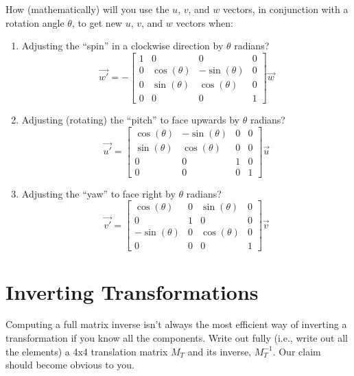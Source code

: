 \documentclass[10pt,twocolumn]{article}
\begin{document}
\begin{framed}
\noindent {\bf [1/2 pt. each]} How (mathematically) will you use the $u$, $v$, and $w$ vectors, in conjunction with a rotation angle $\theta$, to get new $u$, $v$, and $w$ vectors when:
\begin{enumerate}
\item Adjusting the ``spin'' in a clockwise direction by $\theta$ radians?\\
\[ \vec{w'} = -\begin{bmatrix}
    1 &            0 &             0 & 0 \\
    0 & \cos(\theta) & -\sin(\theta) & 0 \\
    0 & \sin(\theta) &  \cos(\theta) & 0 \\
               0 &             0 & 0 & 1
\end{bmatrix}\vec{w}\]


\item Adjusting (rotating) the ``pitch'' to face upwards by $\theta$ radians?\\
\[\vec{u'} = \begin{bmatrix}
    \cos(\theta) & -\sin(\theta) & 0 & 0 \\
    \sin(\theta) &  \cos(\theta) & 0 & 0 \\
               0 &             0 & 1 & 0 \\
               0 &             0 & 0 & 1
\end{bmatrix}\vec{u}
\]
\item Adjusting the ``yaw'' to face right by $\theta$ radians?\\
\[ \vec{v'} = \begin{bmatrix}
    \cos(\theta)  & 0 & \sin(\theta) & 0 \\
               0  & 1 &            0 & 0 \\
    -\sin(\theta) & 0 & \cos(\theta) & 0 \\
               0  & 0 &            0 & 1
\end{bmatrix}\vec{v}\]
\end{enumerate}
\end{framed}

\section{Inverting Transformations}
\begin{framed}
\noindent {\bf [1 point]} Computing a full matrix inverse isn't always the most efficient way of inverting a transformation if you know all the components. Write out fully (i.e., write out all the elements) a 4x4 translation matrix $M_T$ and its inverse, $M^{-1}_T$. Our claim should become obvious to you.
\end{framed}
\end{document}
